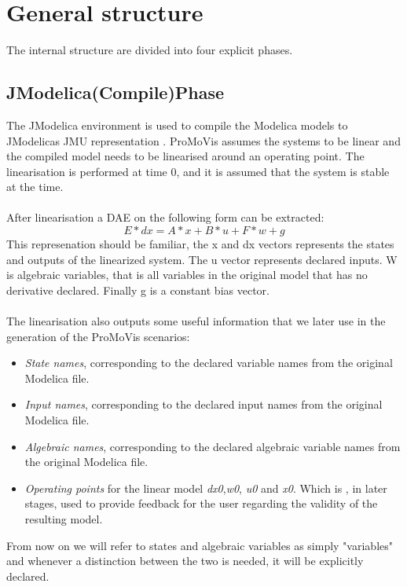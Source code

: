 \section{General structure}
The internal structure are divided into four explicit phases. 
\subsection{JModelica(Compile)Phase}
The JModelica environment is used to compile the Modelica models to JModelicas JMU representation \cite{jmodelicaorg}\nocite{*}. ProMoVis assumes the systems to be linear and the compiled model needs to be linearised around an operating point. The linearisation is performed at time 0, and it is assumed that the system is stable at the time.\\\\After linearisation a DAE on the following form can be extracted:
\begin{equation}
E*dx = A*x + B*u + F*w + g
\end{equation}
This represenation should be familiar, the x and dx vectors represents the states and outputs of the linearized system. The u vector represents declared inputs. W is algebraic variables, that is all variables in the original model that has no derivative declared. Finally g is a constant bias vector.\\\\The linearisation also outputs some useful information that we later use in the generation of the ProMoVis scenarios:
\begin{itemize}
\item \textit{State names}, corresponding to the declared variable names from the original Modelica file.
\item \textit{Input names}, corresponding to the declared input names from the original Modelica file.
\item \textit{Algebraic names}, corresponding to the declared algebraic variable names from the original Modelica file.
\item \textit{Operating points} for the linear model \textit{dx0},\textit{w0}, \textit{u0} and \textit{x0}. Which is , in later stages, used to provide feedback for the user regarding the validity of the resulting model.
\end{itemize}
From now on we will refer to states and algebraic variables as simply "variables" and whenever a distinction between the two is needed, it will be explicitly declared. 

